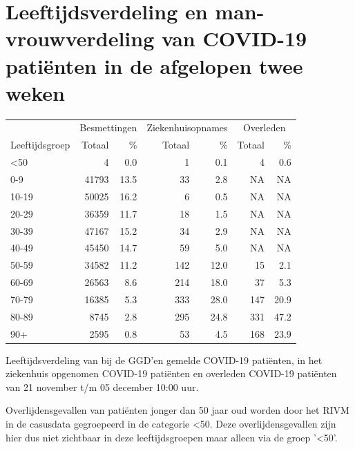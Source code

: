 \documentclass[
  english,
  man,floatsintext]{apa6}
\begin{document}
\hypertarget{leeftijdsverdeling-en-man-vrouwverdeling-van-covid-19-patiuxebnten-in-de-afgelopen-twee-weken}{%
\section{Leeftijdsverdeling en man-vrouwverdeling van COVID-19 patiënten in de afgelopen twee weken}\label{leeftijdsverdeling-en-man-vrouwverdeling-van-covid-19-patiuxebnten-in-de-afgelopen-twee-weken}}

\begin{table}
\centering\begingroup\fontsize{11}{13}\selectfont

\begin{threeparttable}
\begin{tabular}{lrrrrrr}
\toprule
\multicolumn{1}{c}{ } & \multicolumn{2}{c}{Besmettingen} & \multicolumn{2}{c}{Ziekenhuisopnames} & \multicolumn{2}{c}{Overleden} \\
\cmidrule(l{3pt}r{3pt}){2-3} \cmidrule(l{3pt}r{3pt}){4-5} \cmidrule(l{3pt}r{3pt}){6-7}
Leeftijdsgroep & Totaal & \% & Totaal & \% & Totaal & \%\\
\midrule
<50 & 4 & 0.0 & 1 & 0.1 & 4 & 0.6\\
0-9 & 41793 & 13.5 & 33 & 2.8 & NA & NA\\
10-19 & 50025 & 16.2 & 6 & 0.5 & NA & NA\\
20-29 & 36359 & 11.7 & 18 & 1.5 & NA & NA\\
30-39 & 47167 & 15.2 & 34 & 2.9 & NA & NA\\
40-49 & 45450 & 14.7 & 59 & 5.0 & NA & NA\\
50-59 & 34582 & 11.2 & 142 & 12.0 & 15 & 2.1\\
60-69 & 26563 & 8.6 & 214 & 18.0 & 37 & 5.3\\
70-79 & 16385 & 5.3 & 333 & 28.0 & 147 & 20.9\\
80-89 & 8745 & 2.8 & 295 & 24.8 & 331 & 47.2\\
90+ & 2595 & 0.8 & 53 & 4.5 & 168 & 23.9\\
\bottomrule
\end{tabular}
\begin{tablenotes}
\item[1] Leeftijdsverdeling van bij de GGD’en gemelde COVID-19 patiënten, in het ziekenhuis opgenomen COVID-19 patiënten en overleden COVID-19 patiënten van 21 november t/m 05 december 10:00 uur.
\item[2] Overlijdensgevallen van patiënten jonger dan 50 jaar oud worden door het RIVM in de casusdata gegroepeerd in de categorie <50. Deze overlijdensgevallen zijn hier dus niet zichtbaar in deze leeftijdsgroepen maar alleen via de groep '<50'.
\end{tablenotes}
\end{threeparttable}
\endgroup{}
\end{table}
\end{document}
